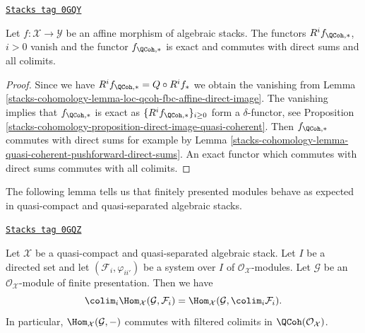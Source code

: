\begin{lemma}
\label{stacks-cohomology-lemma-quasi-coherent-pushforward-affine}
\href{https://stacks.math.columbia.edu/tag/0GQY}{\texttt{Stacks tag 0GQY}}

Let $f : \mathcal{X} \to \mathcal{Y}$ be an affine morphism of algebraic
stacks. The functors $R^if_{\QCoh, *}$, $i > 0$ vanish and the functor
$f_{\QCoh, *}$ is exact and commutes with direct sums and all colimits.
\end{lemma}

\begin{proof}
Since we have $R^if_{\QCoh, *} = Q \circ R^if_*$ we obtain the
vanishing from Lemma \ref{stacks-cohomology-lemma-loc-qcoh-fbc-affine-direct-image}.
The vanishing implies that $f_{\QCoh, *}$ is exact as
$\{R^if_{\QCoh, *}\}_{i \geq 0}$ form a $\delta$-functor, see
Proposition \ref{stacks-cohomology-proposition-direct-image-quasi-coherent}.
Then $f_{\QCoh, *}$ commutes with direct sums for example by
Lemma \ref{stacks-cohomology-lemma-quasi-coherent-pushforward-direct-sums}.
An exact functor which commutes with direct sums commutes
with all colimits.
\end{proof}

The following lemma tells us that finitely presented modules behave
as expected in quasi-compact and quasi-separated algebraic stacks.

\begin{lemma}
\label{stacks-cohomology-lemma-finite-presentation-quasi-compact-colimit}
\href{https://stacks.math.columbia.edu/tag/0GQZ}{\texttt{Stacks tag 0GQZ}}

Let $\mathcal{X}$ be a quasi-compact and quasi-separated algebraic stack.
Let $I$ be a directed set and let $(\mathcal{F}_i, \varphi_{ii'})$ be a
system over $I$ of $\mathcal{O}_\mathcal{X}$-modules. Let $\mathcal{G}$ be an
$\mathcal{O}_\mathcal{X}$-module of finite presentation. Then we have
$$
\colim_i \Hom_\mathcal{X}(\mathcal{G}, \mathcal{F}_i)
=
\Hom_\mathcal{X}(\mathcal{G}, \colim_i \mathcal{F}_i).
$$
In particular, $\Hom_\mathcal{X}(\mathcal{G}, -)$ commutes with filtered
colimits in $\QCoh(\mathcal{O}_\mathcal{X})$.
\end{lemma}

